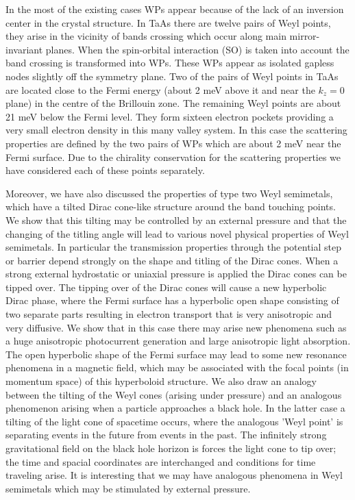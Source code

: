 \documentclass[prb,twocolumn,aps,superscriptaddress,showpacs,floatfix]{revtex4}
\begin{document}
	In the most of the existing cases WPs appear because of the lack of an inversion center in the crystal structure. In TaAs there are twelve pairs of Weyl points, they arise in the vicinity of bands crossing which occur along main mirror-invariant planes. When the spin-orbital interaction (SO) is taken into account the band crossing is transformed into WPs. These WPs appear as isolated gapless nodes slightly off the symmetry plane. Two of the pairs of Weyl points in TaAs are located close to the Fermi energy (about 2 meV above it and near the $k_z=0$ plane) in the centre of the Brillouin zone. The remaining Weyl points are about 21 meV below the Fermi level. They form sixteen electron pockets providing a very small electron density in this many valley system. In this case the scattering properties are defined by the two pairs of  WPs which are about 2 meV near the Fermi surface. Due to the chirality conservation for the scattering properties we have considered each of these points separately.

	Moreover, we have also discussed the properties of type two Weyl semimetals, which have a tilted Dirac cone-like structure around the band touching points. We show that this tilting may be controlled by an external pressure and that the changing of the titling angle will lead to various novel physical properties of Weyl semimetals. In particular the transmission properties through the potential step or barrier depend strongly on the shape and titling of the Dirac cones. When a strong  external hydrostatic or uniaxial pressure is applied the Dirac cones can be tipped over. The tipping over of the Dirac cones will cause a new hyperbolic Dirac phase, where  the Fermi surface has a hyperbolic open shape consisting of two separate parts resulting in electron transport that is very anisotropic and very diffusive. We show that in this case there may arise new phenomena such as a huge anisotropic photocurrent generation and large anisotropic light absorption. The open hyperbolic shape of the  Fermi surface may lead to some new resonance phenomena in a magnetic field, which may be associated with the focal points (in momentum space)  of this hyperboloid structure. We also draw an analogy between the tilting of the Weyl cones (arising under pressure) and an analogous phenomenon arising when a particle approaches a black hole. In the latter case a tilting of the light cone of spacetime occurs, where the analogous 'Weyl point' is separating events in the future from events in the past. The infinitely strong gravitational field on the black hole horizon is forces the light cone to tip over\cite{Novikov-1963}; the time and spacial coordinates are interchanged and conditions for time traveling arise\cite{Novikov-1990}. It is interesting that we may have analogous phenomena in Weyl semimetals which may be stimulated by external pressure.
\end{document}
